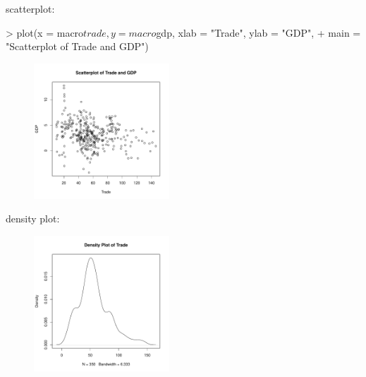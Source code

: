 \documentclass[handout]{beamer}
\newcommand{\red}{\color{red}}
\begin{document}
\begin{frame}[fragile]
scatterplot:
\red
\footnotesize
\medskip
\begin{Schunk}
\begin{Sinput}
> plot(x = macro$trade, y = macro$gdp, xlab = "Trade", ylab = "GDP", 
+     main = "Scatterplot of Trade and GDP")
\end{Sinput}
\end{Schunk}
\begin{figure}
\includegraphics[width=2in, height=2in]{rslides-plot1.pdf}
\end{figure}
\end{frame}

\begin{frame}[fragile]
density plot:
\red
\footnotesize
\medskip
\begin{Schunk}
\end{Schunk}
\begin{figure}
\includegraphics[width=2in, height=2in]{rslides-plot2.pdf}
\end{figure}
\end{frame}
\end{document}
